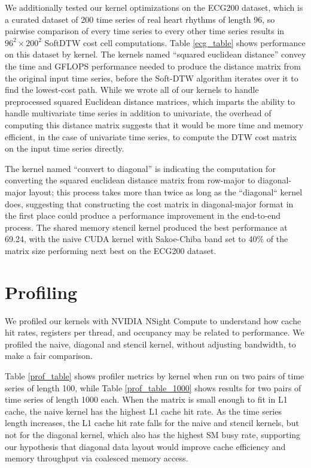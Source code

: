 \documentclass[12pt, letterpaper]{article}
\begin{document}
We additionally tested our kernel optimizations on the ECG200 dataset, which is
a curated dataset of 200 time series of real heart rhythms of length 96, so
pairwise comparison of every time series to every other time series results in
$96^2 \times 200^2$ SoftDTW cost cell computations. Table \ref{ecg_table} shows
performance on this dataset by kernel. The kernels named ``squared euclidean
distance'' convey the time and GFLOPS performance needed to produce the distance
matrix from the original input time series, before the Soft-DTW algorithm
iterates over it to find the lowest-cost path. While we wrote all of our kernels
to handle preprocessed squared Euclidean distance matrices, which imparts the
ability to handle multivariate time series in addition to univariate, the
overhead of computing this distance matrix suggests that it would be more time
and memory efficient, in the case of univariate time series, to compute the DTW
cost matrix on the input time series directly.

The kernel named ``convert to diagonal'' is indicating the
computation for converting the squared euclidean distance matrix from row-major
to diagonal-major layout; this process takes more than twice as long as the
``diagonal`` kernel does, suggesting that constructing the cost matrix in
diagonal-major format in the first place could produce a performance improvement
in the end-to-end process. The shared memory stencil kernel produced the best
performance at 69.24, with the naive CUDA kernel with Sakoe-Chiba band set to
40\% of the matrix size performing next best on the ECG200 dataset.



\FloatBarrier
\section{Profiling}

We profiled our kernels with NVIDIA NSight Compute to understand how cache hit
rates, registers per thread, and occupancy may be related to performance. We
profiled the naive, diagonal and stencil kernel, without adjusting bandwidth, to
make a fair comparison.

Table \ref{prof_table} shows profiler metrics by kernel when run on two pairs of
time series of length 100, while Table \ref{prof_table_1000} shows results for
two pairs of time series of length 1000 each. When the matrix is small enough to
fit in L1 cache, the naive kernel has the highest L1 cache hit rate. As the time
series length increases, the L1 cache hit rate falls for the naive and stencil
kernels, but not for the diagonal kernel, which also has the highest SM busy
rate, supporting our hypothesis that diagonal data layout would improve cache
efficiency and memory throughput via coalesced memory access.
\end{document}
